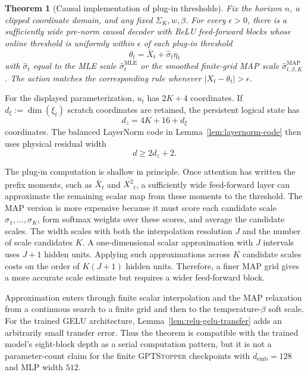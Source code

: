 \documentclass[11pt]{article}
\newtheorem{theorem}{Theorem}
\begin{document}
\begin{theorem}[Causal implementation of plug-in thresholds]
\label{thm:baseline-implementability}
Fix the horizon \(n\), a clipped coordinate domain, and any fixed \(\Sigma_K,w,\beta\). For every \(\epsilon>0\), there is a sufficiently wide pre-norm causal decoder with ReLU feed-forward blocks whose online threshold is uniformly within \(\epsilon\) of each plug-in threshold
\[
\theta_t=\bar X_t+\widehat\sigma_t\eta_t
\]
with \(\widehat\sigma_t\) equal to the MLE scale \(\widehat\sigma_t^{\mathrm{MLE}}\) or the smoothed finite-grid MAP scale \(\widehat\sigma^{\mathrm{MAP}}_{t,\beta,K}\). The action matches the corresponding rule whenever \(|X_t-\theta_t|>\epsilon\).
\end{theorem}

For the displayed parameterization, \(u_t\) has \(2K+4\) coordinates. If \(d_\xi:=\dim(\xi_t)\) scratch coordinates are retained, the persistent logical state has
\[
d_z = 4K+16+d_\xi
\]
coordinates. The balanced LayerNorm code in Lemma~\ref{lem:layernorm-code} then uses physical residual width
\[
d \ge 2d_z+2.
\]

The plug-in computation is shallow in principle. Once attention has written the prefix moments, such as \(\bar X_t\) and \(\overline{X^2}_t\), a sufficiently wide feed-forward layer can approximate the remaining scalar map from these moments to the threshold.  The MAP version is more expensive because it must score each candidate scale \(\sigma_1,\ldots,\sigma_K\), form softmax weights over these scores, and average the candidate scales. The width scales with both the interpolation resolution \(J\) and the number of scale candidates \(K\). A one-dimensional scalar approximation with \(J\) intervals uses \(J+1\) hidden units. Applying such approximations across \(K\) candidate scales costs on the order of \(K(J+1)\) hidden units. Therefore, a finer MAP grid gives a more accurate scale estimate but requires a wider feed-forward block.

Approximation enters through finite scalar interpolation and the MAP relaxation from a continuous search to a finite grid and then to the temperature-\(\beta\) soft scale. For the trained GELU architecture, Lemma~\ref{lem:relu-gelu-transfer} adds an arbitrarily small transfer error. Thus the theorem is compatible with the trained model's eight-block depth as a serial computation pattern, but it is not a parameter-count claim for the finite \textsc{GPTStopper} checkpoints with \(d_{\mathrm{emb}}=128\) and MLP width \(512\). 
\end{document}

